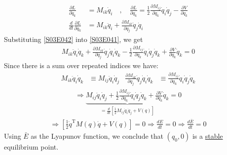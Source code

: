 \begin{solution}
\begin{align}\label{S03E042}
		\frac{\partial L}{\partial \dot{q}_k} &= M_{ik}\dot{q}_i \quad , \quad \frac{\partial L}{\partial q_k} = \frac{1}{2} \frac{\partial M_{ij}}{\partial q_k}\dot{q}_i\dot{q}_j - \frac{\partial V}{\partial q_k} \\
		\frac{d}{dt} \frac{\partial L}{\partial \dot{q}_k} &= M_{ik}\ddot{q}_i + \frac{\partial M_{ik}}{\partial q_j}\dot{q}_j\dot{q}_i
\end{align}
Substituting \eqref{S03E042} into \eqref{S03E041}, we get
\begin{align}
	M_{ik} \ddot{q}_i\dot{q}_k + \frac{\partial M_{ik}}{\partial q_j}\dot{q}_j\dot{q}_i\dot{q}_k - \frac{1}{2}\frac{\partial M_{ij}}{\partial q_k}\dot{q}_i\dot{q}_j\dot{q}_k + \frac{\partial V}{\partial q_k}\dot{q}_k = 0
\end{align}
Since there is a sum over repeated indices we have:
\begin{align}
	M_{ik}\ddot{q}_i\dot{q}_k &\equiv M_{ij}\ddot{q}_i\dot{q}_j & \frac{\partial M_{ik}}{\partial q_j}\dot{q}_j\dot{q}_i\dot{q}_k &\equiv \frac{\partial M_{ij}}{\partial q_k}\dot{q}_i\dot{q}_j\dot{q}_k
\end{align}
\begin{align}
	\Longrightarrow \underbrace{M_{ij}\ddot{q}_i\dot{q}_j + \frac{1}{2} \frac{\partial M_{ij}}{\partial q_k}\dot{q}_i\dot{q}_j\dot{q}_k + \frac{\partial V}{\partial q_k}\dot{q}_k}_{ \displaystyle =\frac{d}{dt}\left[ \frac{1}{2}M_{ij}\dot{q}_i\dot{q}_j+V(q) \right]} = 0
\end{align}
\begin{align}
	\Longrightarrow \left[ \frac{1}{2}\dot{q}^\text{T}M(q)\dot{q} + V(q) \right] = 0 \Longrightarrow \frac{dE}{dt}=0 \Longrightarrow \frac{d\bar{E}}{dt}=0
\end{align}
Using $\bar{E}$ as the Lyapunov function, we conclude that $(q_0,0)$ is a \underline{stable} equilibrium point.
\end{solution}


